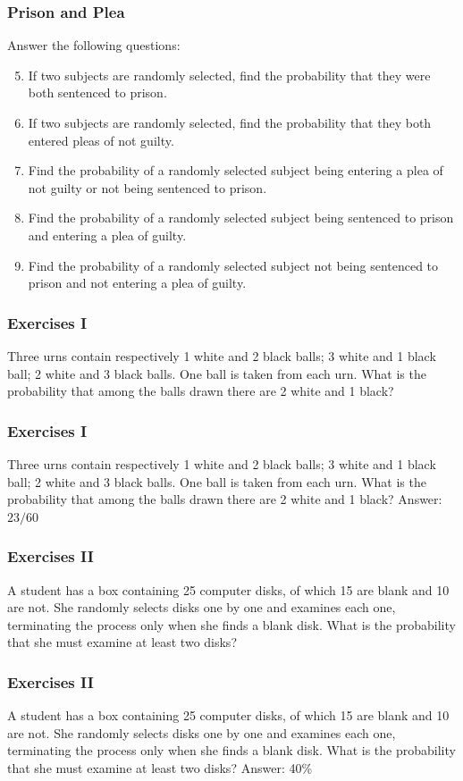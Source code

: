 \documentclass[xcolor=dvipsnames]{beamer}
\begin{document}
\begin{frame}
  \frametitle{Prison and Plea}
Answer the following questions:
\begin{enumerate}
\setcounter{enumi}{4}
\item If two subjects are randomly selected, find the probability
  that they were both sentenced to prison.
\item If two subjects are randomly selected, find the probability
  that they both entered pleas of not guilty.
\item Find the probability of a randomly selected subject being
  entering a plea of not guilty or not being sentenced to prison.
\item Find the probability of a randomly selected subject being
  sentenced to prison and entering a plea of guilty.
\item Find the probability of a randomly selected subject not being
  sentenced to prison and not entering a plea of guilty.
\end{enumerate}
\end{frame}

\begin{frame}
  \frametitle{Exercises I}
Three urns contain respectively 1 white and 2 black balls; 3 white and
1 black ball; 2 white and 3 black balls. One ball is taken from each
urn. What is the probability that among the balls drawn there are 2
white and 1 black?
\end{frame}

\begin{frame}
  \frametitle{Exercises I}
Three urns contain respectively 1 white and 2 black balls; 3 white and
1 black ball; 2 white and 3 black balls. One ball is taken from each
urn. What is the probability that among the balls drawn there are 2
white and 1 black? Answer: $23/60$
\end{frame}

\begin{frame}
  \frametitle{Exercises II}
A student has a box containing 25 computer disks, of which 15 are
blank and 10 are not. She randomly selects disks one by one and
examines each one, terminating the process only when she finds a blank
disk. What is the probability that she must examine at least two disks?
\end{frame}

\begin{frame}
  \frametitle{Exercises II}
A student has a box containing 25 computer disks, of which 15 are
blank and 10 are not. She randomly selects disks one by one and
examines each one, terminating the process only when she finds a blank
disk. What is the probability that she must examine at least two
disks? Answer: 40\%
\end{frame}
\end{document}
